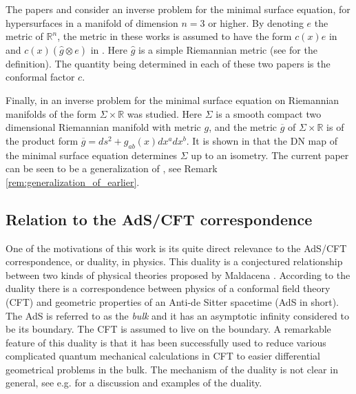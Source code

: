 \documentclass[12pt]{amsart}
\def\R{\mathbb R}
\theoremstyle{definition}
\theoremstyle{remark}
\begin{document}
The papers \cite{nurminen1} and \cite{nurminen2} consider an inverse problem for the minimal surface equation, for hypersurfaces in a manifold of dimension $n=3$ or higher. By denoting $e$ the metric of $\R^n$, the metric in these works is assumed to have the  form 
$c(x)e$ in \cite{nurminen1} and $c(x)(\hat g\otimes e)$ in \cite{nurminen2}. Here $\hat g$ is a simple Riemannian metric  (see \cite{nurminen2} for the definition). The quantity being determined in each of these two papers is the conformal factor $c$.

Finally, in \cite{carstea2022inverse} an inverse problem for the minimal surface equation on Riemannian manifolds of the form $\Sigma\times\R$ was studied. Here $\Sigma$ is a smooth compact two dimensional Riemannian manifold with metric $g$, and the metric $\overline g$ of $\Sigma\times\R$ is of the product form $\overline g = ds^2+g_{ab}(x)dx^adx^b$. 
It is shown in \cite{carstea2022inverse} that the DN map of the minimal surface equation determines $\Sigma$ up to an isometry. 
The current paper can be seen to be a generalization of \cite{carstea2022inverse}, see Remark \ref{rem:generalization_of_earlier}. %




\subsection{Relation to the AdS/CFT correspondence}\label{sec:adscft}
One of the motivations of this work is its quite direct relevance to the AdS/CFT correspondence, or duality, in physics. This duality is a conjectured relationship between two kinds of physical theories proposed by Maldacena \cite{maldacena1999large}. According to the duality there is a correspondence between physics of a conformal field theory (CFT) and geometric properties of an Anti-de Sitter spacetime (AdS in short). The AdS is referred to as the \emph{bulk} and it has an asymptotic infinity considered to be its boundary. The CFT is assumed to live on the boundary. A remarkable feature of this duality is that it has been successfully used to reduce various complicated quantum mechanical calculations in CFT to easier differential geometrical problems in the bulk.  The mechanism of the duality is not clear in general, see e.g. \cite{van2009comments} for a discussion and examples of the duality.
\end{document}

